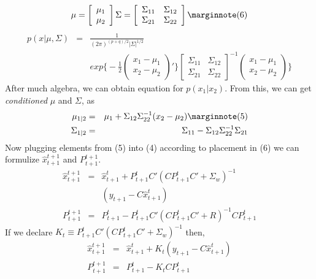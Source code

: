 \begin{eqnarray*}
\mu = 
\left[ \begin{array}{c}
      \mu_1 \\
      \mu_2
      \end{array} \right]           
\Sigma = 
\left[ \begin{array}{cc}
      \Sigma_{11} & \Sigma_{12}\\
      \Sigma_{21} & \Sigma_{22}
      \end{array} \right] \mlabel{6}
\end{eqnarray*}
\begin{eqnarray*}
p(x|\mu,\Sigma) &=& \frac{1}{(2\pi)^{(p+q)/2}|\Sigma|^{1/2}} \\
&& exp\bigg\{
-\frac{1}{2}
\left( \begin{array}{c}
      x_1 - \mu_1 \\
      x_2 - \mu_2
      \end{array} \right)'
\bigg\}
\left[ \begin{array}{cc}
      \Sigma_{11} & \Sigma_{12}\\
      \Sigma_{21} & \Sigma_{22}
      \end{array} \right]^{-1}
\left( \begin{array}{c}
      x_1 - \mu_1 \\
      x_2 - \mu_2
      \end{array} \right)
\bigg\} 
\end{eqnarray*}
After much algebra, we can obtain equation for $p(x_1|x_2)$. From this, we can
get {\em conditioned} $\mu$ and $\Sigma$, as
\begin{eqnarray*}
\mu_{1|2} &=& \mu_1 + \Sigma_{12}\Sigma_{22}^{-1}(x_2 - \mu_2) \mlabel{5} \\
\Sigma_{1|2} &=& \Sigma_{11}-\Sigma_{12}\Sigma_{22}^{-1}\Sigma_{21} \nonumber
\end{eqnarray*}
Now plugging elements from  (5) into (4) according
to placement in (6) we can formulize $\hat{x}_{t+1}^{t+1}$ and
$P_{t+1}^{t+1}$. 
\begin{eqnarray*}
\hat{x}_{t+1}^{t+1} &=& \hat{x}_{t+1}^t + P_{t+1}^tC'
                  (CP_{t+1}^tC'+ \Sigma_{w})^{-1} \\
               &&   (y_{t+1} - C\hat{x}_{t+1}^t) \\
P_{t+1}^{t+1} &=& P_{t+1}^t - P_{t+1}^tC' (CP_{t+1}^tC' + R)^{-1}CP_{t+1}^t
\end{eqnarray*}
If we declare $K_t \equiv P_{t+1}^tC' (CP_{t+1}^tC'+ \Sigma_{w})^{-1}$ then,
\begin{eqnarray*}
\hat{x}_{t+1}^{t+1} &=& \hat{x}_{t+1}^t + K_t (y_{t+1} -
C\hat{x}_{t+1}^t) \label{xtplus1} \\
P_{t+1}^{t+1} &=& P_{t+1}^t - K_t C P_{t+1}^t
\end{eqnarray*}

